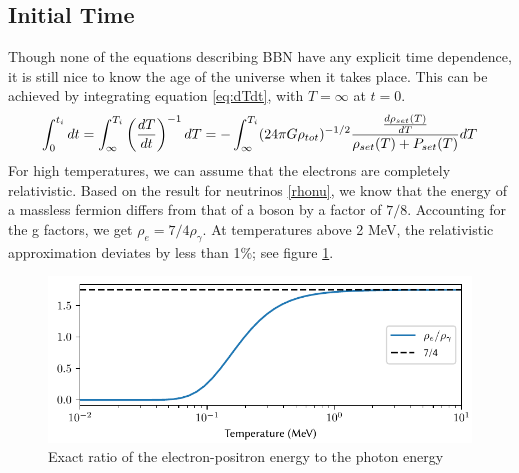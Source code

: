 \subsection{Initial Time}
\label{sec:t_ini}
Though none of the equations describing BBN have any explicit time dependence, it is still nice to know the age of the universe when it takes place. This can be achieved by integrating equation \eqref{eq:dTdt}, with $T=\infty$ at $t=0$.
\begin{align}
    \int_{0}^{t_i}dt=\int_{\infty}^{T_i}\left(\frac{dT}{dt}\right)^{-1}dT=-\int_{\infty}^{T_i}(24\pi G\rho_{tot})^{-1/2}\frac{\frac{d\rho_{set}(T)}{dT}}{\rho_{set}(T) + P_{set}(T)}dT
    \label{eq:ti_integral}
\end{align}
For high temperatures, we can assume that the electrons are completely relativistic. Based on the result for neutrinos \eqref{rhonu}, we know that the energy of a massless fermion differs from that of a boson by a factor of $7/8$. Accounting for the g factors, we get $\rho_e=7/4 \rho_\gamma$. At temperatures above 2 MeV, the relativistic approximation deviates by less than 1\%; see figure \ref{fig:rhoegammaT}.
\begin{figure}[ht]
    \includegraphics[width=5.1in]{figures/rhoegammaT.pdf}
    \caption{Exact ratio of the electron-positron energy to the photon energy}
    \label{fig:rhoegammaT}
\end{figure}

